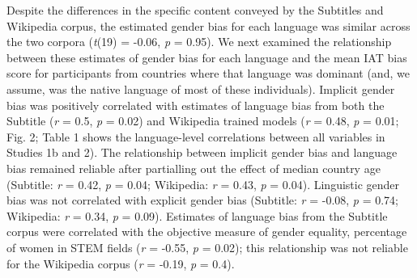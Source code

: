 \documentclass[9pt,twocolumn,twoside]{pnas-new}
\begin{document}
Despite the differences in the specific content conveyed by the
Subtitles and Wikipedia corpus, the estimated gender bias for each
language was similar across the two corpora (\emph{t}(19) = -0.06,
\emph{p} = 0.95). We next examined the relationship between these
estimates of gender bias for each language and the mean IAT bias score
for participants from countries where that language was dominant (and,
we assume, was the native language of most of these individuals).
Implicit gender bias was positively correlated with estimates of
language bias from both the Subtitle (\emph{r} = 0.5, \emph{p} = 0.02)
and Wikipedia trained models (\emph{r} = 0.48, \emph{p} = 0.01; Fig. 2;
Table 1 shows the language-level correlations between all variables in
Studies 1b and 2). The relationship between implicit gender bias and
language bias remained reliable after partialling out the effect of
median country age (Subtitle: \emph{r} = 0.42, \emph{p} = 0.04;
Wikipedia: \emph{r} = 0.43, \emph{p} = 0.04). Linguistic gender bias was
not correlated with explicit gender bias (Subtitle: \emph{r} = -0.08,
\emph{p} = 0.74; Wikipedia: \emph{r} = 0.34, \emph{p} = 0.09). Estimates
of language bias from the Subtitle corpus were correlated with the
objective measure of gender equality, percentage of women in STEM fields
(\emph{r} = -0.55, \emph{p} = 0.02); this relationship was not reliable
for the Wikipedia corpus (\emph{r} = -0.19, \emph{p} = 0.4).

\begingroup\fontsize{4}{5}\selectfont
\setlength\tabcolsep{1.7pt} %
\end{document}
